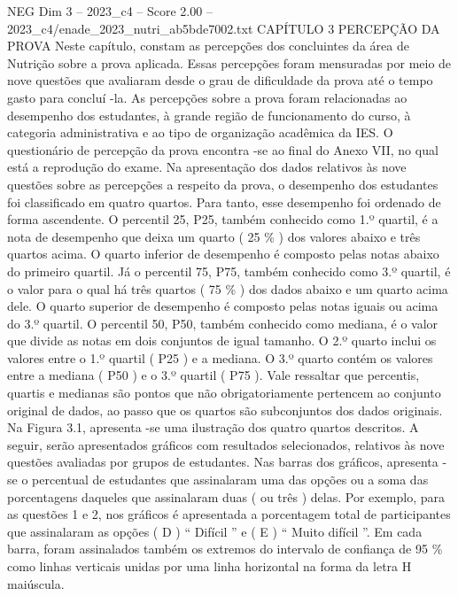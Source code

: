 \begin{textsample}{NEG Dim 3 – 2023\_c4 – Score 2.00 – 2023\_c4/enade\_2023\_nutri\_ab5bde7002.txt}  \label{ex:f3_neg_208}
CAPÍTULO 3 PERCEPÇÃO DA PROVA Neste capítulo, constam as percepções dos concluintes da área de Nutrição sobre a prova aplicada.
Essas percepções foram mensuradas por meio de nove questões que avaliaram desde o grau de dificuldade da prova até o tempo gasto para concluí -la.
As percepções sobre a prova foram relacionadas ao desempenho dos estudantes, à grande região de funcionamento do curso, à categoria administrativa e ao tipo de organização acadêmica da IES.
O questionário de percepção da prova encontra -se ao final do Anexo VII, no qual está a reprodução do exame.
Na apresentação dos dados relativos às nove questões sobre as percepções a respeito da prova, o desempenho dos estudantes foi classificado em quatro quartos.
Para tanto, esse desempenho foi ordenado de forma ascendente.
O percentil 25, P25, também conhecido como 1.º quartil, é a nota de desempenho que deixa um quarto ( 25 \% ) dos valores abaixo e três quartos acima.
O quarto inferior de desempenho é composto pelas notas abaixo do primeiro quartil.
Já o percentil 75, P75, também conhecido como 3.º quartil, é o valor para o qual há três quartos ( 75 \% ) dos dados abaixo e um quarto acima dele.
O quarto superior de desempenho é composto pelas notas iguais ou acima do 3.º quartil.
O percentil 50, P50, também conhecido como mediana, é o valor que divide as notas em dois conjuntos de igual tamanho.
O 2.º quarto inclui os valores entre o 1.º quartil ( P25 ) e a mediana.
O 3.º quarto contém os valores entre a mediana ( P50 ) e o 3.º quartil ( P75 ).
Vale ressaltar que percentis, quartis e medianas são pontos que não obrigatoriamente pertencem ao conjunto original de dados, ao passo que os quartos são subconjuntos dos dados originais.
Na Figura 3.1, apresenta -se uma ilustração dos quatro quartos descritos.
A seguir, serão apresentados gráficos com resultados selecionados, relativos às nove questões avaliadas por grupos de estudantes.
Nas barras dos gráficos, apresenta -se o percentual de estudantes que assinalaram uma das opções ou a soma das porcentagens daqueles que assinalaram duas ( ou três ) delas.
Por exemplo, para as questões 1 e 2, nos gráficos é apresentada a porcentagem total de participantes que assinalaram as opções ( D ) “ Difícil ” e ( E ) “ Muito difícil ”.
Em cada barra, foram assinalados também os extremos do intervalo de confiança de 95 \% como linhas verticais unidas por uma linha horizontal na forma da letra H maiúscula.

\end{textsample}
